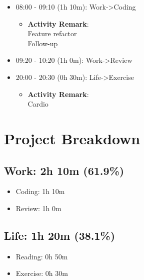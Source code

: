 \documentclass[12pt]{extarticle}
\begin{document}
\begin{itemize}[topsep=0pt, itemsep=-0.5ex]
    \item 08:00 - 09:10 (1h 10m): Work->Coding
    \begin{itemize}[topsep=0pt, itemsep=-0.5ex]
        \item \textbf{Activity Remark}:\\
        Feature refactor\\
Follow-up
    \end{itemize}
    \item 09:20 - 10:20 (1h 0m): Work->Review
    \item 20:00 - 20:30 (0h 30m): Life->Exercise
    \begin{itemize}[topsep=0pt, itemsep=-0.5ex]
        \item \textbf{Activity Remark}:\\
        Cardio
    \end{itemize}
\end{itemize}

{\fontsize{16}{19.2}\selectfont\section*{Project Breakdown}}

{\fontsize{16}{19.2}\selectfont\subsection*{Work: 2h 10m (61.9\%)}}
\begin{itemize}[topsep=0pt, itemsep=-0.5ex]
    \item Coding: 1h 10m
    \item Review: 1h 0m
\end{itemize}
{\fontsize{16}{19.2}\selectfont\subsection*{Life: 1h 20m (38.1\%)}}
\begin{itemize}[topsep=0pt, itemsep=-0.5ex]
    \item Reading: 0h 50m
    \item Exercise: 0h 30m
\end{itemize}
\end{document}
